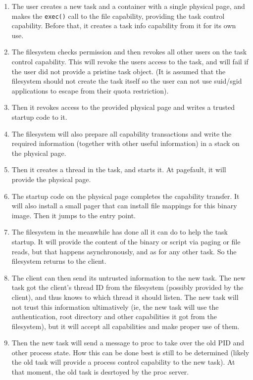\begin{enumerate}
\item The user creates a new task and a container with a single
  physical page, and makes the \texttt{exec()} call to the file
  capability, providing the task control capability.  Before that, it
  creates a task info capability from it for its own use.
\item The filesystem checks permission and then revokes all other
  users on the task control capability.  This will revoke the users
  access to the task, and will fail if the user did not provide a
  pristine task object.  (It is assumed that the filesystem should not
  create the task itself so the user can not use suid/sgid
  applications to escape from their quota restriction).
\item Then it revokes access to the provided physical page and writes
  a trusted startup code to it.
\item The filesystem will also prepare all capability transactions and
  write the required information (together with other useful
  information) in a stack on the physical page.
\item Then it creates a thread in the task, and starts it.  At
  pagefault, it will provide the physical page.
\item The startup code on the physical page completes the capability
  transfer.  It will also install a small pager that can install file
  mappings for this binary image.  Then it jumps to the entry point.
\item The filesystem in the meanwhile has done all it can do to help
  the task startup.  It will provide the content of the binary or
  script via paging or file reads, but that happens asynchronously,
  and as for any other task.  So the filesystem returns to the client.
\item The client can then send its untrusted information to the new
  task.  The new task got the client's thread ID from the filesystem
  (possibly provided by the client), and thus knows to which thread it
  should listen.  The new task will not trust this information
  ultimatively (ie, the new task will use the authentication, root
  directory and other capabilities it got from the filesystem), but it
  will accept all capabilities and make proper use of them.
\item Then the new task will send a message to proc to take over the
  old PID and other process state.  How this can be done best is still
  to be determined (likely the old task will provide a process control
  capability to the new task).  At that moment, the old task is
  desrtoyed by the proc server.
\end{enumerate}

